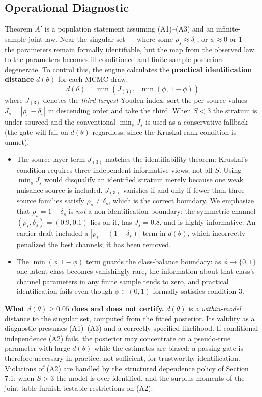 \documentclass[11pt,a4paper]{article}
\begin{document}
\subsection{Operational Diagnostic}
Theorem $A'$ is a population statement assuming (A1)--(A3) and an infinite-sample joint law. Near the singular set --- where some $\rho_s \approx \delta_s$, or $\phi \approx 0$ or $1$ --- the parameters remain formally identifiable, but the map from the observed law to the parameters becomes ill-conditioned and finite-sample posteriors degenerate. To control this, the engine calculates the \textbf{practical identification distance} $d(\theta)$ for each MCMC draw:
\[
d(\theta) = \min \left( J_{(3)}, \;\; \min(\phi,\, 1 - \phi) \right) %
\]
where $J_{(3)}$ denotes the \emph{third-largest} Youden index: sort the per-source values $J_s = |\rho_s - \delta_s|$ in descending order and take the third. When $S < 3$ the stratum is under-sourced and the conventional $\min_s J_s$ is used as a conservative fallback (the gate will fail on $d(\theta)$ regardless, since the Kruskal rank condition is unmet). %
\begin{itemize}
    \item The source-layer term $J_{(3)}$ matches the identifiability theorem: Kruskal's condition requires three independent informative views, not all $S$. Using $\min_s J_s$ would disqualify an identified stratum merely because one weak nuisance source is included. $J_{(3)}$ vanishes if and only if fewer than three source families satisfy $\rho_s \neq \delta_s$, which is the correct boundary. We emphasize that $\rho_s = 1 - \delta_s$ is \emph{not} a non-identification boundary: the symmetric channel $(\rho_s, \delta_s) = (0.9, 0.1)$ lies on it, has $J_s = 0.8$, and is highly informative. An earlier draft included a $|\rho_s - (1 - \delta_s)|$ term in $d(\theta)$, which incorrectly penalized the best channels; it has been removed. %
    \item The $\min(\phi, 1 - \phi)$ term guards the class-balance boundary: as $\phi \to \{0, 1\}$ one latent class becomes vanishingly rare, the information about that class's channel parameters in any finite sample tends to zero, and practical identification fails even though $\phi \in (0, 1)$ formally satisfies condition 3. %
\end{itemize}
\textbf{What $d(\theta) \ge 0.05$ does and does not certify.} $d(\theta)$ is a \emph{within-model} distance to the singular set, computed from the fitted posterior. Its validity as a diagnostic presumes (A1)--(A3) and a correctly specified likelihood. If conditional independence (A2) fails, the posterior may concentrate on a pseudo-true parameter with large $d(\theta)$ while the estimates are biased: a passing gate is therefore necessary-in-practice, not sufficient, for trustworthy identification. Violations of (A2) are handled by the structured dependence policy of Section 7.1; when $S > 3$ the model is over-identified, and the surplus moments of the joint table furnish testable restrictions on (A2). %
\end{document}
